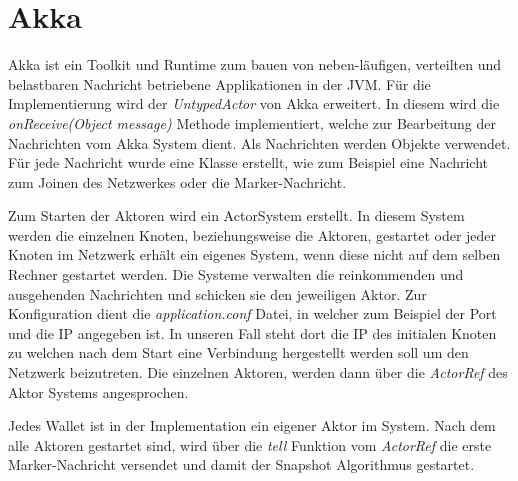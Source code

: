 \section{Akka}
\label{sec:akka}

Akka ist ein Toolkit und Runtime zum bauen von neben-läufigen, verteilten und
belastbaren Nachricht betriebene Applikationen in der JVM. \cite{akka}
Für die Implementierung wird der \textit{UntypedActor} von Akka erweitert.
In diesem wird die \textit{onReceive(Object message)} Methode implementiert, 
welche zur Bearbeitung der Nachrichten vom Akka System dient.
Als Nachrichten werden Objekte verwendet.
Für jede Nachricht wurde eine Klasse erstellt, wie zum Beispiel eine Nachricht
zum Joinen des Netzwerkes oder die Marker-Nachricht.

Zum Starten der Aktoren wird ein ActorSystem erstellt.
In diesem System werden die einzelnen Knoten, beziehungsweise die Aktoren,
gestartet oder jeder Knoten im Netzwerk erhält ein eigenes System, wenn diese
nicht auf dem selben Rechner gestartet werden.
Die Systeme verwalten die reinkommenden und ausgehenden Nachrichten und 
schicken sie den jeweiligen Aktor.
Zur Konfiguration dient die \textit{application.conf} Datei, in welcher zum 
Beispiel der Port und die IP angegeben ist.
In unseren Fall steht dort die IP des initialen Knoten zu welchen nach dem 
Start eine Verbindung hergestellt werden soll um den Netzwerk beizutreten.
Die einzelnen Aktoren, werden dann über die \textit{ActorRef} des Aktor Systems
angesprochen.

Jedes Wallet ist in der Implementation ein eigener Aktor im System.
Nach dem alle Aktoren gestartet sind, wird über die \textit{tell} Funktion 
vom \textit{ActorRef} die erste Marker-Nachricht versendet und damit der 
Snapshot Algorithmus gestartet.
